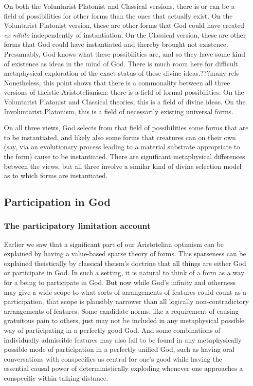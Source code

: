 On both the Voluntarist Platonist and Classical versions, there is or can be a field of possibilities for other forms than 
the ones that actually exist. On the Voluntarist Platonist version, these are other forms that God could have created
\textit{ex nihilo} independently of instantiation.  On the Classical version, these are other forms that God could have 
instantiated and thereby brought not existence. Presumably, God knows what these possibilities are, and so they have some 
kind of existence as ideas in the mind of God. There is much room here for difficult metaphysical exploration of the 
exact status of these divine ideas.???many-refs Nonetheless, this point shows that there is a commonality between all three
versions of theistic Aristotelianism: there is a field of formal possibilities. On the Voluntarist Platonist and Classical
theories, this is a field of divine ideas. On the Involuntarist Platonism, this is a field of necessarily existing 
universal forms.

On all three views, God selects from that field of possibilities some forms that are to be instantiated, and likely also some  forms that creatures can on their own (say, via an evolutionary process leading to a material substrate
appropriate to the form) cause to be instantiated. There are significant metaphysical differences between the
views, but all three involve a similar kind of divine selection model as to which forms are instantiated.

\subsection{Participation in God}
\subsubsection{The participatory limitation account}
Earlier we saw that a significant part of our Aristotelian optimism can be explained by having a value-based sparse
theory of forms. This sparseness can be explained theistically by classical theism's doctrine 
that all things are either God or participate in God. In such a setting, it is natural to think of a form as a way for 
a being to participate in God. But now while God's infinity and otherness may give a wide scope to what sorts of
arrangements of features could count as a participation, that scope is plausibly narrower than all logically non-contradictory
arrangements of features. Some candidate norms, like a requirement of causing gratuitous pain to others, just may not be included 
in any metaphysical possible way of participating in a perfectly good God. And some combinations of individually admissible features may also 
fail to be found in any metaphysically possible mode of participation in a perfectly unified God, such as having oral conversations with 
conspecifics as central for one's good while having the essential causal power of deterministically exploding whenever one approaches a 
conspecific within talking distance. 

